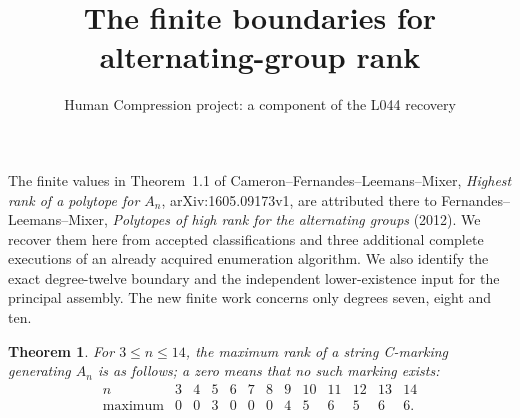 \documentclass[11pt,a4paper]{article}
\title{The finite boundaries for alternating-group rank}
\author{Human Compression project: a component of the L044 recovery}
\date{}
\newtheorem{theorem}{Theorem}
\begin{document}
\maketitle
The finite values in Theorem~1.1 of Cameron--Fernandes--Leemans--Mixer,
\emph{Highest rank of a polytope for $A_n$}, arXiv:1605.09173v1,
are attributed there to Fernandes--Leemans--Mixer,
\emph{Polytopes of high rank for the alternating groups} (2012).
We recover them here from accepted classifications and three
additional complete executions of an already acquired enumeration
algorithm. We also identify the exact degree-twelve boundary and
the independent lower-existence input for the principal assembly.
The new finite work concerns only degrees seven, eight and ten.

\begin{theorem}\label{finite}
For $3\le n\le14$, the maximum rank of a string C-marking
generating $A_n$ is as follows; a zero means that no such marking
exists:
\[
\begin{array}{c|rrrrrrrrrrrr}
n&3&4&5&6&7&8&9&10&11&12&13&14\\\hline
\text{maximum}&0&0&3&0&0&0&4&5&6&5&6&6.
\end{array}
\]
\end{theorem}
\end{document}
